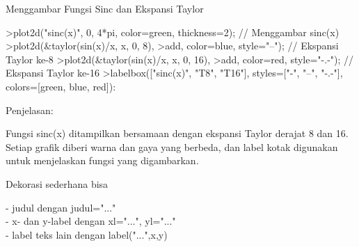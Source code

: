 \documentclass{article}
\begin{document}
\begin{eulernotebook}
\begin{eulercomment}
\begin{eulercomment}
\begin{eulercomment}
\begin{eulercomment}
\begin{eulercomment}
\begin{eulercomment}
\begin{eulercomment}
\begin{eulercomment}
\begin{eulercomment}
\begin{eulercomment}
\begin{eulercomment}
\begin{eulercomment}
\begin{eulercomment}
\end{eulercomment}
\eulersubheading{}
\begin{eulercomment}
Menggambar Fungsi Sinc dan Ekspansi Taylor\\
\end{eulercomment}
\eulersubheading{}
\begin{eulerprompt}
>plot2d("sinc(x)", 0, 4*pi, color=green, thickness=2); // Menggambar sinc(x)
>plot2d(&taylor(sin(x)/x, x, 0, 8), >add, color=blue, style="--"); // Ekspansi Taylor ke-8
>plot2d(&taylor(sin(x)/x, x, 0, 16), >add, color=red, style="-.-"); // Ekspansi Taylor ke-16
>labelbox(["sinc(x)", "T8", "T16"], styles=["-", "--", "-.-"], colors=[green, blue, red]):
\end{eulerprompt}
\begin{eulercomment}
Penjelasan:

Fungsi sinc(x) ditampilkan bersamaan dengan ekspansi Taylor derajat 8
dan 16. Setiap grafik diberi warna dan gaya yang berbeda, dan label
kotak digunakan untuk menjelaskan fungsi yang digambarkan.\\
\end{eulercomment}
\eulersubheading{}
\begin{eulercomment}
\end{eulercomment}
\begin{eulercomment}
Dekorasi sederhana bisa

- judul dengan judul="..."\\
- x- dan y-label dengan xl="...", yl="..."\\
- label teks lain dengan label("...",x,y)


\end{eulercomment}
\end{eulercomment}
\end{eulercomment}
\end{eulercomment}
\end{eulercomment}
\end{eulercomment}
\end{eulercomment}
\end{eulercomment}
\end{eulercomment}
\end{eulercomment}
\end{eulercomment}
\end{eulercomment}
\end{eulercomment}
\end{eulernotebook}
\end{document}
